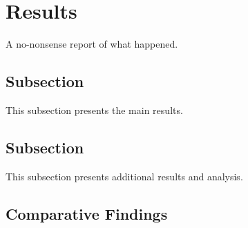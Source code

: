 \section{Results}\label{sec:Results}
\textcolor{black!40}{A no-nonsense report of what happened.}
\subsection{Subsection}
This subsection presents the main results.

\textcolor{black!30}{\lipsum[40-44]}


\subsection{Subsection}
This subsection presents additional results and analysis.

\textcolor{black!30}{\lipsum[45-48]}

\subsection{Comparative Findings}
\textcolor{black!30}{\lipsum[49-52]}

